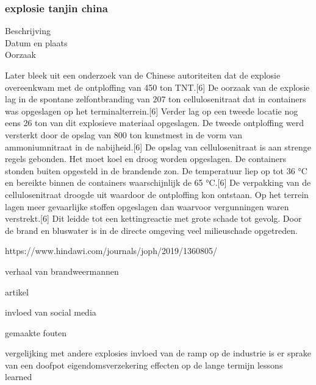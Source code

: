 \subsubsection{explosie tanjin china }

\begin{description}
\item[Beschrijving]
\item[Datum en plaats] 
\item[Oorzaak]
\end{description}

Later bleek uit een onderzoek van de Chinese autoriteiten dat de explosie overeenkwam met de ontploffing van 450 ton TNT.[6] 
De oorzaak van de explosie lag in de spontane zelfontbranding van 207 ton cellulosenitraat dat in containers was opgeslagen op het terminalterrein.[6] 
Verder lag op een tweede locatie nog eens 26 ton van dit explosieve materiaal opgeslagen.
De tweede ontploffing werd versterkt door de opslag van 800 ton kunstmest in de vorm van ammoniumnitraat in de nabijheid.[6]
De opslag van cellulosenitraat is aan strenge regels gebonden. Het moet koel en droog worden opgeslagen. De containers stonden buiten opgesteld in de brandende zon. De temperatuur liep op tot 36 °C en bereikte binnen de containers waarschijnlijk de 65 °C.[6] De verpakking van de cellulosenitraat droogde uit waardoor de ontploffing kon ontstaan. Op het terrein lagen meer gevaarlijke stoffen opgeslagen dan waarvoor vergunningen waren verstrekt.[6] Dit leidde tot een kettingreactie met grote schade tot gevolg. Door de brand en bluswater is in de directe omgeving veel milieuschade opgetreden.


https://www.hindawi.com/journals/joph/2019/1360805/ 
\cite{jiang16042019TanjinExplosion}

verhaal van brandweermannen

\cite{staff31082015tanjinblastunrevealed}
artikel

\cite{chinafile18082015tanjinexplosion}
invloed van social media

\cite{pinghuang2410201TanjinFactreport}

gemaakte fouten
\cite{portoTanjinExplosionSight}

\cite{imago17082015TanjinApartmentImages}
\cite{trager14082015Chemicalblast}
\cite{pangeramo27082015TanjinExplosion}
vergelijking met andere explosies
\cite{ap06082020ammaniumnitrate}
invloed van de ramp op de industrie
\cite{morris14082015TanjinIndustryImpact}
is er sprake van een doofpot
\cite{milesyu20082015exposingtoxicgovlines}
eigendomsverzekering
\cite{artemis30032016tanjininsurance}
\cite{aidenxiatanjinblast}
effecten op de lange termijn
\cite{danwangTanjinflexreport}
\cite{keyHighlightsTanjin}
lessons learned


